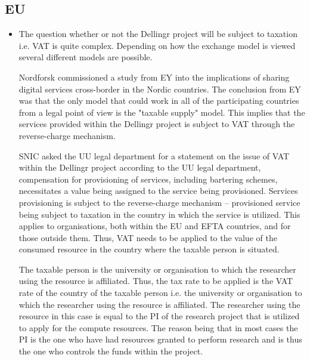\documentclass{article}
\newcommand{\dell}{Dellingr\xspace}
\begin{document}
\subsection{EU}
\begin{itemize}
    \item []
The question whether or not the \dell project will be subject to taxation i.e. VAT is quite complex. Depending on how the exchange model is viewed several different models are possible. 

Nordforsk commissioned a study from EY into the implications of sharing digital services cross-border in the Nordic countries. 
The conclusion from EY was that the only model that could work in all of the participating countries from a legal point of view is the "taxable supply" model. 
This implies that the services provided within the \dell project is subject to VAT through the reverse-charge mechanism.   

SNIC asked the UU legal department for a statement on the issue of VAT within the \dell project according to the UU legal department, compensation for provisioning of services, including bartering schemes, necessitates a value being assigned to the service being provisioned. 
Services provisioning is subject to the reverse-charge mechanism – provisioned service being subject to taxation in the country in which the service is utilized. 
This applies to organisations, both within the EU and EFTA countries, and for those outside them. 
Thus, VAT needs to be applied to the value of the consumed resource in the country where the taxable person is situated.

The taxable person is the university or organisation to which the researcher using the resource is affiliated. 
Thus, the tax rate to be applied is the VAT rate of the country of the taxable person i.e. the university or organisation to which the researcher using the resource is affiliated. 
The researcher using the resource in this case is equal to the PI of the research project that is utilized to apply for the compute resources. 
The reason being that in most cases the PI is the one who have had resources granted to perform research and is thus the one who controls the funds within the project.

\end{itemize}
\end{document}
